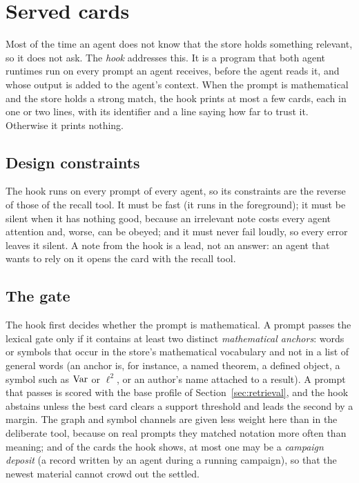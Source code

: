 \section{Served cards}\label{sec:hook}

Most of the time an agent does not know that the store holds something relevant, so it does not ask. The \emph{hook} addresses this. It is a program that both agent runtimes run on every prompt an agent receives, before the agent reads it, and whose output is added to the agent's context. When the prompt is mathematical and the store holds a strong match, the hook prints at most a few cards, each in one or two lines, with its identifier and a line saying how far to trust it. Otherwise it prints nothing.

\subsection{Design constraints}
The hook runs on every prompt of every agent, so its constraints are the reverse of those of the recall tool. It must be fast (it runs in the foreground); it must be silent when it has nothing good, because an irrelevant note costs every agent attention and, worse, can be obeyed; and it must never fail loudly, so every error leaves it silent. A note from the hook is a lead, not an answer: an agent that wants to rely on it opens the card with the recall tool.

\subsection{The gate}
The hook first decides whether the prompt is mathematical. A prompt passes the lexical gate only if it contains at least two distinct \emph{mathematical anchors}: words or symbols that occur in the store's mathematical vocabulary and not in a list of general words (an anchor is, for instance, a named theorem, a defined object, a symbol such as $\operatorname{Var}$ or $\ell^2$, or an author's name attached to a result). A prompt that passes is scored with the base profile of Section~\ref{sec:retrieval}, and the hook abstains unless the best card clears a support threshold and leads the second by a margin. The graph and symbol channels are given less weight here than in the deliberate tool, because on real prompts they matched notation more often than meaning; and of the cards the hook shows, at most one may be a \emph{campaign deposit} (a record written by an agent during a running campaign), so that the newest material cannot crowd out the settled.

